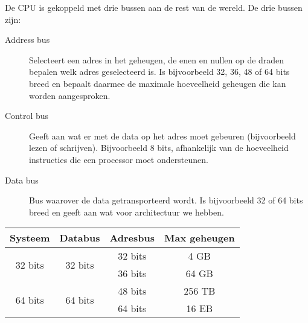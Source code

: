 De CPU is gekoppeld met drie bussen aan de rest van de wereld. De drie bussen zijn:
\begin{description}
\item [Address bus] Selecteert een adres in het geheugen, de enen en nullen op de draden bepalen welk adres geselecteerd is. Is bijvoorbeeld 32, 36, 48 of 64 bits breed en bepaalt daarmee de maximale hoeveelheid geheugen die kan worden aangesproken.
\item [Control bus] Geeft aan wat er met de data op het adres moet gebeuren (bijvoorbeeld lezen of schrijven). Bijvoorbeeld 8 bits, afhankelijk van de hoeveelheid instructies die een processor moet ondersteunen.
\item [Data bus] Bus waarover de data getransporteerd wordt. Is bijvoorbeeld 32 of 64 bits breed en geeft aan wat voor architectuur we hebben.
\end{description}

\begin{center}
	\begin{tabular}{ |c|c|c|c| }
		\hline
		Systeem & Databus & Adresbus & Max geheugen \\
		\hline\hline
		\multirow{2}{*}{32 bits} & \multirow{2}{*}{32 bits} & 32 bits & 4 GB \\
		& & 36 bits & 64 GB \\
		\hline
		\multirow{2}{*}{64 bits} & \multirow{2}{*}{64 bits} & 48 bits & 256 TB \\
		& & 64 bits & 16 EB \\
		\hline
	\end{tabular}
\end{center}

